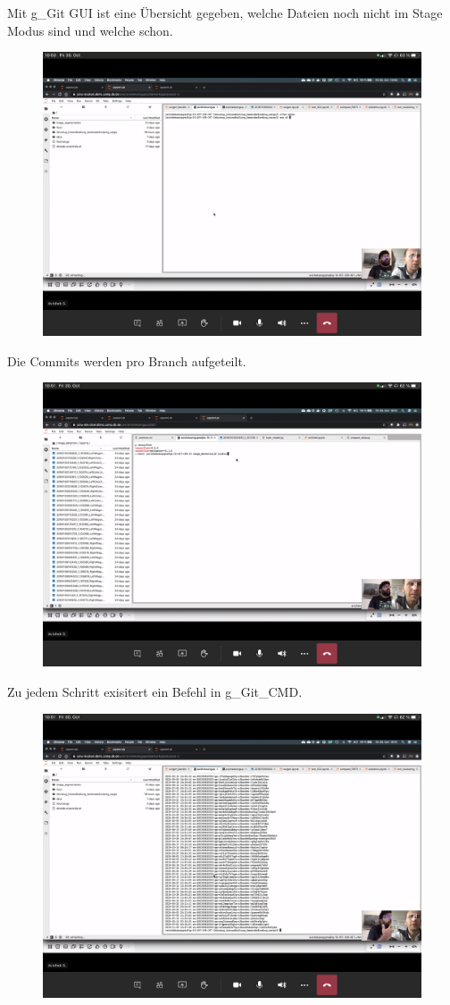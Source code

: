 Mit \gls{g_Git} GUI ist eine Übersicht gegeben, welche Dateien noch nicht im Stage Modus sind und welche schon. 
\begin{figure}[H]
	\centering
	\includegraphics[width=0.7\linewidth]{attachment/chapter_6/Scc001}
\end{figure}
Die Commits werden pro Branch aufgeteilt.
\begin{figure}[H]
	\centering
	\includegraphics[width=0.7\linewidth]{attachment/chapter_6/Scc003}
\end{figure}
Zu jedem Schritt exisitert ein Befehl in \gls{g_Git_CMD}.
\begin{figure}[H]
	\centering
	\includegraphics[width=0.7\linewidth]{attachment/chapter_6/Scc002}
\end{figure}

